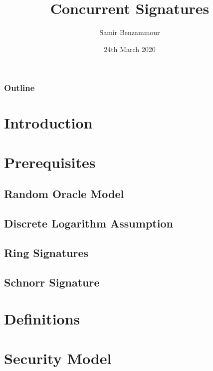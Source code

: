 \documentclass{beamer}
\title{Concurrent Signatures}
\author{Samir Benzammour}
\date{24th March 2020}
\institute[RWTH]{
  Algorithms and Computational Complexity\\
  RWTH Aachen University
}
\begin{document}
\frame{\titlepage}

\begin{frame}
	\frametitle{Outline}
	\tableofcontents
\end{frame}

\section{Introduction}


\section{Prerequisites}


\subsection{Random Oracle Model}


\subsection{Discrete Logarithm Assumption}


\subsection{Ring Signatures}


\subsection{Schnorr Signature}


\section{Definitions}


\section{Security Model}

\end{document}
